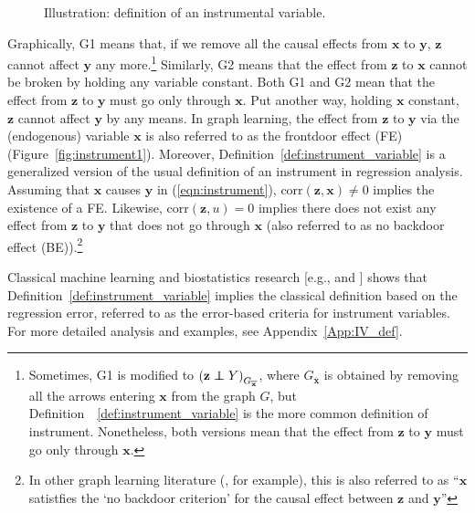 \documentclass[11pt,review,authoryear]{elsarticle}
\begin{document}
\begin{figure}[h]
  \centering
  \hfil
  \caption{Illustration: definition of an instrumental variable.}
  \label{fig:instrument}
\end{figure}

\noindent
Graphically, G1 means that, if we remove all the causal effects from $\mathbf{x}$ to $\mathbf{y}$, $\mathbf{z}$ cannot affect $\mathbf{y}$ any more.\footnote{Sometimes, G1 is modified to $\left(\mathbf{z} \perp\!\!\!\!\perp Y \right)_{G_{\overline{\mathbf{x}}}}$, where $G_{\overline{\mathbf{x}}}$ is obtained by removing all the arrows entering $\mathbf{x}$ from the graph $G$, but Definition~~\ref{def:instrument_variable} is the more common definition of instrument. Nonetheless, both versions mean that the effect from $\mathbf{z}$ to $\mathbf{y}$ must go only through $\mathbf{x}$.} Similarly, G2 means that the effect from $\mathbf{z}$ to $\mathbf{x}$ cannot be broken by holding any variable constant. Both G1 and G2 mean that the effect from $\mathbf{z}$ to $\mathbf{y}$ must go only through $\mathbf{x}$. Put another way, holding $\mathbf{x}$ constant, $\mathbf{z}$ cannot affect $\mathbf{y}$ by any means. In graph learning, the effect from $\mathbf{z}$ to $\mathbf{y}$ via the (endogenous) variable $\mathbf{x}$ is also referred to as the frontdoor effect (FE) (Figure~\ref{fig:instrument1}). Moreover, Definition~\ref{def:instrument_variable} is a generalized version of the usual definition of an instrument in regression analysis. Assuming that $\mathbf{x}$ causes $\mathbf{y}$ in (\ref{eqn:instrument}), $\mathrm{corr} \left( \mathbf{z}, \mathbf{x} \right) \neq 0$ implies the existence of a FE. Likewise, $\mathrm{corr} \left( \mathbf{z}, u \right) = 0$ implies there does not exist any effect from $\mathbf{z}$ to $\mathbf{y}$ that does not go through $\mathbf{x}$ (also referred to as no backdoor effect (BE)).\footnote{In other graph learning literature (\citet{pearl2009causality}, for example), this is also referred to as ``$\mathbf{x}$ satistfies the `no backdoor criterion' for the causal effect between $\mathbf{z}$ and $\mathbf{y}$''}

Classical machine learning and biostatistics research [e.g., \citet{spirtes2000causation} and \citet{pearl2009causality}] shows that Definition~\ref{def:instrument_variable} implies the classical definition based on the regression error, referred to as the error-based criteria for instrument variables. For more detailed analysis and examples, see Appendix~\ref{App:IV_def}.
\end{document}
